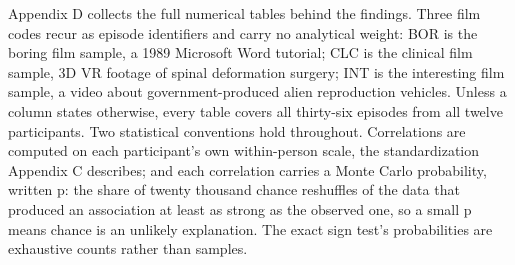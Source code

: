 %

Appendix D collects the full numerical tables behind the findings. Three film codes recur as
episode identifiers and carry no analytical weight: BOR is the boring film sample, a 1989
Microsoft Word tutorial; CLC is the clinical film sample, 3D VR footage of spinal deformation
surgery; INT is the interesting film sample, a video about government-produced alien
reproduction vehicles. Unless a column states otherwise, every table covers all thirty-six
episodes from all twelve participants. Two statistical conventions hold throughout.
Correlations are computed on each participant's own within-person scale, the standardization
Appendix C describes; and each correlation carries a Monte Carlo probability, written p: the
share of twenty thousand chance reshuffles of the data that produced an association at least
as strong as the observed one, so a small p means chance is an unlikely explanation. The
exact sign test's probabilities are exhaustive counts rather than samples.

